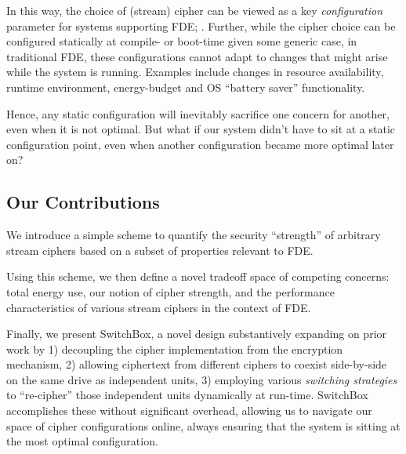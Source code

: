 In this way, the choice of (stream) cipher can be viewed as a key
\emph{configuration} parameter for systems supporting FDE; . Further, while the
cipher choice can be configured statically at compile- or boot-time given some
generic case, in traditional FDE, these configurations cannot adapt to changes
that might arise while the system is running. Examples include changes in
resource availability, runtime environment, energy-budget and OS ``battery
saver'' functionality.

Hence, any static configuration will inevitably sacrifice one concern for
another, even when it is not optimal. But what if our system didn't have to sit
at a static configuration point, even when another configuration became more
optimal later on?

\subsection{Our Contributions}

We introduce a simple scheme to quantify the security ``strength'' of
arbitrary stream ciphers based on a subset of properties relevant to
FDE.

Using this scheme, we then define a novel tradeoff space of competing concerns:
total energy use, our notion of cipher strength, and the performance
characteristics of various stream ciphers in the context of FDE.

Finally, we present SwitchBox, a novel design substantively expanding on prior
work by 1) decoupling the cipher implementation from the encryption mechanism,
2) allowing ciphertext from different ciphers to coexist side-by-side on the
same drive as independent units, 3) employing various \emph{switching
strategies} to ``re-cipher'' those independent units dynamically at run-time.
SwitchBox accomplishes these without significant overhead, allowing us to
navigate our space of cipher configurations online, always ensuring that the
system is sitting at the most optimal configuration.


